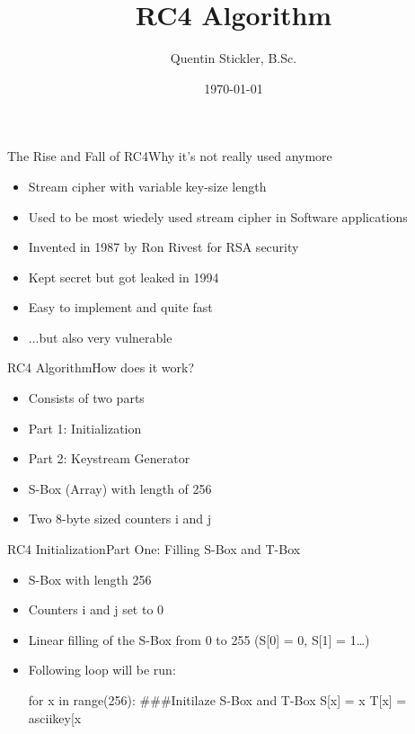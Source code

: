 \documentclass[
	aspectratio=169,	%
	onlytextwidth,		%
	t,					%
	]{beamer}
\title[RC4-Algorithmus]{RC4 Algorithm}
\author[Quentin Stickler]{Quentin Stickler, B.Sc.}
\date{\today} %
\begin{document}
\begin{frame}[fragile]{The Rise and Fall of RC4}{Why it's not really used anymore}
	\begin{itemize}
		\item Stream cipher with variable key-size length
		\item Used to be most wiedely used stream cipher in Software applications
		\item Invented in 1987 by Ron Rivest for RSA security
		\item Kept secret but got leaked in 1994
		\item Easy to implement and quite fast
		\item ...but also very vulnerable
		
	\end{itemize}
\end{frame}



\begin{frame}[fragile]{RC4 Algorithm}{How does it work?}
	\begin{itemize}
		\item Consists of two parts
		\item Part 1: Initialization
		\item Part 2: Keystream Generator
		\item S-Box (Array) with length of 256
		\item Two 8-byte sized counters i and j
	\end{itemize}
\end{frame}

\begin{frame}[fragile]{RC4 Initialization}{Part One: Filling S-Box and T-Box}
	\begin{itemize}
		\item S-Box with length 256
		\item Counters i and j set to 0
		\item Linear filling of the S-Box from 0 to 255 (S[0] = 0, S[1] = 1\dots)
		\item Following loop will be run:

		\begin{python}
			for x in range(256):		###Initilaze S-Box and T-Box
			S[x] = x
			T[x] = asciikey[x %
		\end{python}
		
	\end{itemize}
\end{frame}
\end{document}
